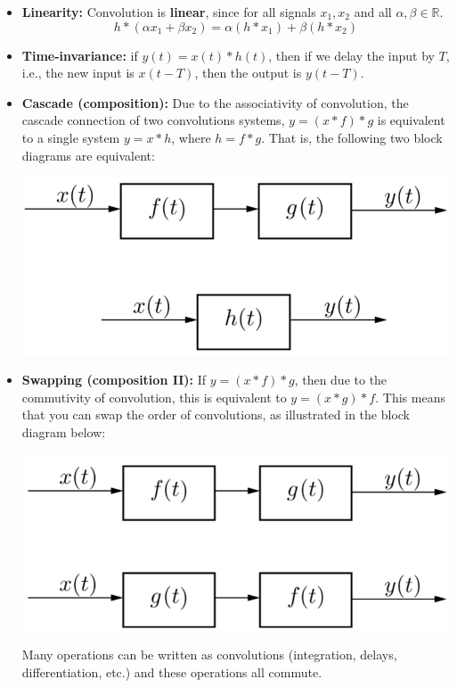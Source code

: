 \documentclass[10pt]{article}
\begin{document}
\begin{itemize}
    \item \textbf{Linearity:} Convolution is \textbf{linear}, since for all signals $x_1, x_2$ and all $\alpha, \beta \in \mathbb{R}$.
    \[h * (\alpha x_1 + \beta x_2) = \alpha(h * x_1) + \beta(h * x_2)\]
    \item \textbf{Time-invariance:} if $y(t) = x(t) * h(t)$, then if we delay the input by $T$, i.e., the new input is $x(t - T)$, then the output is $y(t - T)$.
    \item \textbf{Cascade (composition):} Due to the associativity of convolution, the cascade connection of two convolutions systems, $y = (x * f) * g$ is equivalent to a single system $y = x * h$, where $h = f * g$.  That is, the following two block diagrams are equivalent:
    \begin{center}
        \includegraphics[scale=0.7]{W4_1.png}
    \end{center}
    \item \textbf{Swapping (composition II):} If $y = (x * f) * g$, then due to the commutivity of convolution, this is equivalent to $y = (x * g) * f$.  This means that you can swap the order of convolutions, as illustrated in the block diagram below:
    \begin{center}
        \includegraphics[scale=0.7]{W4_2.png}
    \end{center}
    Many operations can be written as convolutions (integration, delays, differentiation, etc.) and these operations all commute.
\end{itemize}
\end{document}
